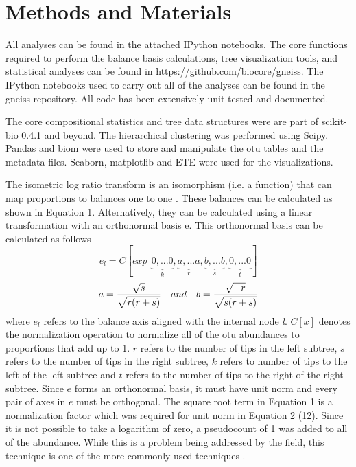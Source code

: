  \section{Methods and Materials}
 All analyses can be found in the attached IPython notebooks.  The core functions required to perform the balance basis calculations, tree visualization tools, and statistical analyses can be found in \url{https://github.com/biocore/gneiss}.  The IPython notebooks used to carry out all of the analyses can be found in the gneiss repository.  All code has been extensively unit-tested and documented. \par
 The core compositional statistics and tree data structures were are part of scikit-bio 0.4.1 and beyond. The hierarchical clustering was performed using Scipy.  Pandas and \gls{biom} \cite{biom} were used to store and manipulate the \gls{otu} tables and the metadata files.  Seaborn, matplotlib and ETE \cite{ete} were used for the visualizations.\par
 The isometric log ratio transform is an isomorphism (i.e. a function) that can map proportions to balances one to one \cite{ilr}.  These balances can be calculated as shown in Equation 1. Alternatively, they can be calculated using a linear transformation with an orthonormal basis e. This orthonormal basis can be calculated as follows
 \begin{equation}
        e_{l}=C\left [exp\: \: \underset{k}{\underbrace{0,...0}},\underset{r}{\underbrace{a,...a}},\underset{s}{\underbrace{b,...b}}, \underset{t}{\underbrace{0,...0}} \right]
 \end{equation}
 \begin{equation}
        a=\frac{\sqrt{s}}{\sqrt{r(r+s)}} \quad  and \quad b=\frac{\sqrt{-r}}{\sqrt{s(r+s)}}\notag
 \end{equation}
 where $e_{l}$ refers to the balance axis aligned with the internal node \textit{l}. $C[x]$ denotes the normalization operation to normalize all of the \gls{otu} abundances to proportions that add up to 1.  $r$ refers to the number of tips in the left subtree, $s$ refers to the number of tips in the right subtree, $k$ refers to number of tips to the left of the left subtree and $t$ refers to the number of tips to the right of the right subtree. Since $e$ forms an orthonormal basis, it must have unit norm and every pair of axes in $e$ must be orthogonal.  The square root term   in Equation 1 is a normalization factor which was required for unit norm in Equation 2 (12).    Since it is not possible to take a logarithm of zero, a pseudocount of 1 was added to all of the abundance.  While this is a problem being addressed by the field, this technique is one of the more commonly used techniques \cite{dealing_with_zeros}.\par
